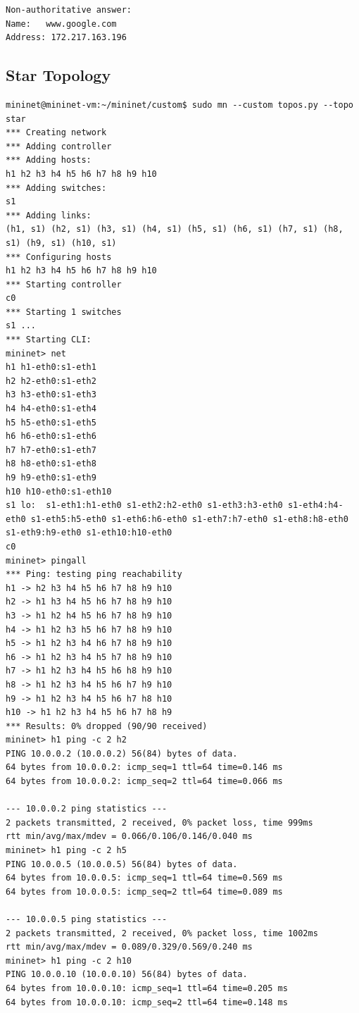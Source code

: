 \documentclass[a4paper, 11pt]{article}
\begin{document}
\begin{appendices}
\begin{lstlisting}[style=BashInputStyle]
Non-authoritative answer:
Name:   www.google.com
Address: 172.217.163.196
\end{lstlisting}

\subsection{Star Topology}
\label{appendix:star}
\begin{lstlisting}[style=BashInputStyle]
mininet@mininet-vm:~/mininet/custom$ sudo mn --custom topos.py --topo star
*** Creating network
*** Adding controller
*** Adding hosts:
h1 h2 h3 h4 h5 h6 h7 h8 h9 h10
*** Adding switches:
s1
*** Adding links:
(h1, s1) (h2, s1) (h3, s1) (h4, s1) (h5, s1) (h6, s1) (h7, s1) (h8, s1) (h9, s1) (h10, s1)
*** Configuring hosts
h1 h2 h3 h4 h5 h6 h7 h8 h9 h10
*** Starting controller
c0
*** Starting 1 switches
s1 ...
*** Starting CLI:
mininet> net
h1 h1-eth0:s1-eth1
h2 h2-eth0:s1-eth2
h3 h3-eth0:s1-eth3
h4 h4-eth0:s1-eth4
h5 h5-eth0:s1-eth5
h6 h6-eth0:s1-eth6
h7 h7-eth0:s1-eth7
h8 h8-eth0:s1-eth8
h9 h9-eth0:s1-eth9
h10 h10-eth0:s1-eth10
s1 lo:  s1-eth1:h1-eth0 s1-eth2:h2-eth0 s1-eth3:h3-eth0 s1-eth4:h4-eth0 s1-eth5:h5-eth0 s1-eth6:h6-eth0 s1-eth7:h7-eth0 s1-eth8:h8-eth0 s1-eth9:h9-eth0 s1-eth10:h10-eth0
c0
mininet> pingall
*** Ping: testing ping reachability
h1 -> h2 h3 h4 h5 h6 h7 h8 h9 h10
h2 -> h1 h3 h4 h5 h6 h7 h8 h9 h10
h3 -> h1 h2 h4 h5 h6 h7 h8 h9 h10
h4 -> h1 h2 h3 h5 h6 h7 h8 h9 h10
h5 -> h1 h2 h3 h4 h6 h7 h8 h9 h10
h6 -> h1 h2 h3 h4 h5 h7 h8 h9 h10
h7 -> h1 h2 h3 h4 h5 h6 h8 h9 h10
h8 -> h1 h2 h3 h4 h5 h6 h7 h9 h10
h9 -> h1 h2 h3 h4 h5 h6 h7 h8 h10
h10 -> h1 h2 h3 h4 h5 h6 h7 h8 h9
*** Results: 0% dropped (90/90 received)
mininet> h1 ping -c 2 h2
PING 10.0.0.2 (10.0.0.2) 56(84) bytes of data.
64 bytes from 10.0.0.2: icmp_seq=1 ttl=64 time=0.146 ms
64 bytes from 10.0.0.2: icmp_seq=2 ttl=64 time=0.066 ms

--- 10.0.0.2 ping statistics ---
2 packets transmitted, 2 received, 0% packet loss, time 999ms
rtt min/avg/max/mdev = 0.066/0.106/0.146/0.040 ms
mininet> h1 ping -c 2 h5
PING 10.0.0.5 (10.0.0.5) 56(84) bytes of data.
64 bytes from 10.0.0.5: icmp_seq=1 ttl=64 time=0.569 ms
64 bytes from 10.0.0.5: icmp_seq=2 ttl=64 time=0.089 ms

--- 10.0.0.5 ping statistics ---
2 packets transmitted, 2 received, 0% packet loss, time 1002ms
rtt min/avg/max/mdev = 0.089/0.329/0.569/0.240 ms
mininet> h1 ping -c 2 h10
PING 10.0.0.10 (10.0.0.10) 56(84) bytes of data.
64 bytes from 10.0.0.10: icmp_seq=1 ttl=64 time=0.205 ms
64 bytes from 10.0.0.10: icmp_seq=2 ttl=64 time=0.148 ms


\end{lstlisting}
\end{appendices}
\end{document}
